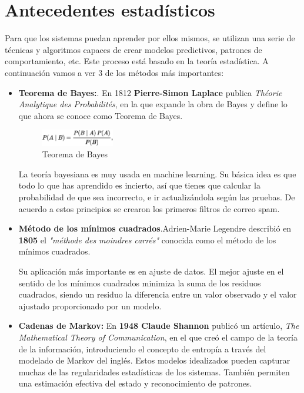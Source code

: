 \documentclass[a4paper, 11pt]{article} %
\begin{document}
\section{Antecedentes estadísticos}
Para que los sistemas puedan aprender por ellos mismos, se utilizan una serie de técnicas y algoritmos capaces de crear modelos predictivos, patrones de comportamiento, etc. Este proceso está basado en la teoría estadística. A continuación vamos a ver 3 de los métodos más importantes:
\begin{itemize}
	\item \textbf{Teorema de Bayes:}. En 1812 \textbf{Pierre-Simon Laplace} publica \emph{Théorie Analytique des Probabilités}, en la que expande la obra de Bayes y define lo que ahora se conoce como Teorema de Bayes.

	\begin{figure}[H]
		\centering
		\includegraphics[width=0.3\textwidth]{bayes.png}
		\caption{Teorema de Bayes}
		\label{Teorema de Bayes}
	\end{figure}

	La teoría bayesiana es muy usada en machine learning. Su básica idea es que todo lo que has aprendido es incierto, así que tienes que calcular la probabilidad de que sea incorrecto, e ir actualizándola según las pruebas. De acuerdo a estos principios se crearon los primeros filtros de correo spam.

	\item \textbf{Método de los mínimos cuadrados}.Adrien-Marie Legendre describió en \textbf{1805} el \emph{"méthode des moindres carrés"} conocida como el método de los mínimos cuadrados.

	Su aplicación más importante es en ajuste de datos. El mejor ajuste en el sentido de los mínimos cuadrados minimiza la suma de los residuos cuadrados, siendo un residuo la diferencia entre un valor observado y el valor ajustado proporcionado por un modelo.
	\item \textbf{Cadenas de Markov:} En \textbf{1948 Claude Shannon} publicó un artículo, \emph{The Mathematical Theory of Communication}, en el que creó el campo de la teoría de la información, introduciendo el concepto de entropía a través del modelado de Markov del inglés. Estos modelos idealizados pueden capturar muchas de las regularidades estadísticas de los sistemas. También permiten una estimación efectiva del estado y reconocimiento de patrones.

\end{itemize}
\end{document}
